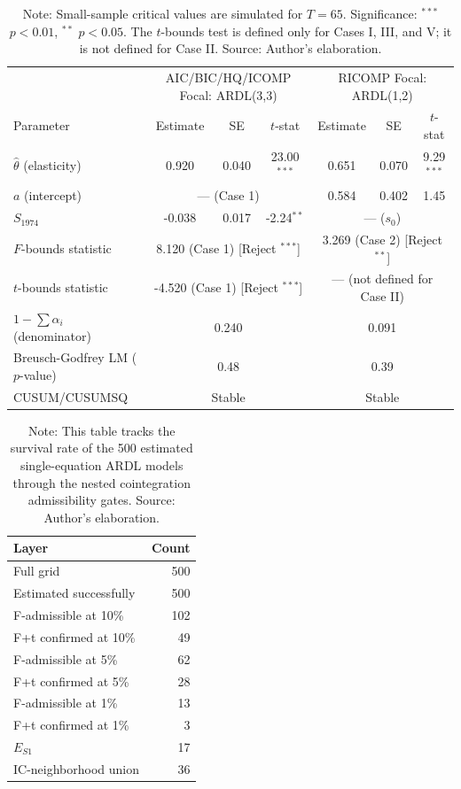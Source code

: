 \begin{table}[H]
\centering
\caption{Stage S1 Focal Single-Equation Estimations}
\label{tab:s1_focal_parameters}
\footnotesize
\begin{tabular}{lcccccc}
\toprule
& \multicolumn{3}{c}{AIC/BIC/HQ/ICOMP Focal: ARDL(3,3)} & \multicolumn{3}{c}{RICOMP Focal: ARDL(1,2)} \\
Parameter & Estimate & SE & $t$-stat & Estimate & SE & $t$-stat \\
\midrule
\midrule
$\hat{\theta}$ (elasticity) & 0.920 & 0.040 & 23.00$^{***}$ & 0.651 & 0.070 & 9.29$^{***}$ \\
$a$ (intercept) & \multicolumn{3}{c}{--- (Case 1)} & 0.584 & 0.402 & 1.45 \\
$S_{1974}$ & -0.038 & 0.017 & -2.24$^{**}$ & \multicolumn{3}{c}{--- ($s_0$)} \\
\midrule
$F$-bounds statistic & \multicolumn{3}{c}{8.120 (Case 1) [Reject $^{***}$]} & \multicolumn{3}{c}{3.269 (Case 2) [Reject $^{**}$]} \\
$t$-bounds statistic & \multicolumn{3}{c}{-4.520 (Case 1) [Reject $^{***}$]} & \multicolumn{3}{c}{--- (not defined for Case II)} \\
$1 - \sum \alpha_i$ (denominator) & \multicolumn{3}{c}{0.240} & \multicolumn{3}{c}{0.091} \\
Breusch-Godfrey LM ($p$-value) & \multicolumn{3}{c}{0.48} & \multicolumn{3}{c}{0.39} \\
CUSUM/CUSUMSQ & \multicolumn{3}{c}{Stable} & \multicolumn{3}{c}{Stable} \\
\bottomrule
\end{tabular}
\caption*{\footnotesize Note: Small-sample critical values are simulated for $T=65$. Significance: $^{***}$ $p<0.01$, $^{**}$ $p<0.05$. The $t$-bounds test is defined only for Cases I, III, and V; it is not defined for Case II. Source: Author's elaboration.}
\end{table}

\begin{table}[H]
\centering
\caption{S1 Shrinking Specification Space Counts}
\label{tab:s1_shrinking_space_counts}
\small
\begin{tabular}{lr}
\toprule
Layer & Count \\
\midrule
\midrule
Full grid & 500 \\
Estimated successfully & 500 \\
F-admissible at 10\% & 102 \\
F+t confirmed at 10\% & 49 \\
F-admissible at 5\% & 62 \\
F+t confirmed at 5\% & 28 \\
F-admissible at 1\% & 13 \\
F+t confirmed at 1\% & 3 \\
$E_{S1}$ & 17 \\
IC-neighborhood union & 36 \\
\bottomrule
\end{tabular}
\caption*{\footnotesize Note: This table tracks the survival rate of the 500 estimated single-equation ARDL models through the nested cointegration admissibility gates. Source: Author's elaboration.}
\end{table}

